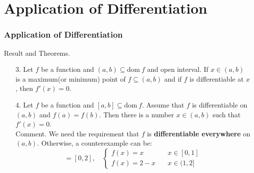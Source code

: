 \documentclass[12pt, t]{beamer}
\begin{document}
\section{Application of Differentiation}
\begin{frame}
    \frametitle{Application of Differentiation}
    Result and Theorems.\\
    \begin{enumerate}
        \item[3.] Let $f$ be a function and $(a,b)\subseteq \text{dom}\  f$ and open interval. If $x\in(a,b)$ is a
            maximum(or minimum) point of $f\subseteq(a,b)$ and if $f$ is differentiable at $x$, then $f'(x)=0$.
            \vspace{0.5em}
        \item[4.] Let $f$ be a function and $[a,b]\subseteq \text{dom}\  f$. Assume that $f$ is differentiable on $(a,b)$ and
            $f(a)=f(b)$. Then there is a number $x\in(a,b)$ such that $f'(x)=0$.\\
            \vspace{0.3em}
            Comment. We need the requirement that $f$ is \textbf{differentiable everywhere} on $(a,b)$. Otherwise, a
            counterexample can be:
            \begin{equation*}
                [a,b]=[0,2],\quad
                \begin{cases}
                    f(x)=x\qquad  & x\in[0,1] \\
                    f(x)=2-x\quad & x\in(1,2]
                \end{cases}
            \end{equation*}

    \end{enumerate}


\end{frame}
\end{document}
